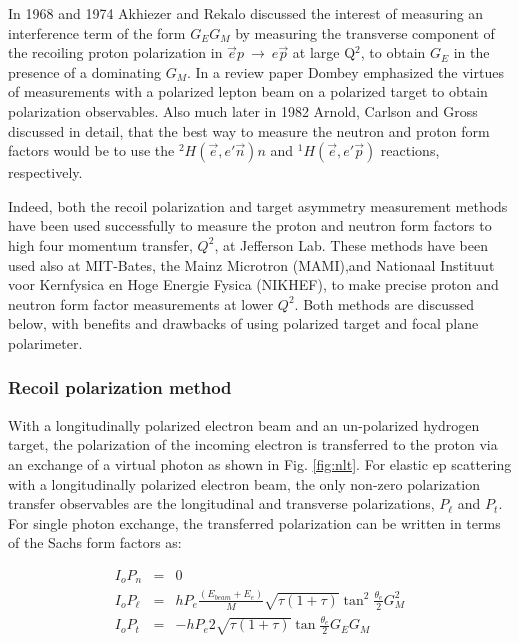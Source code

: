 In 1968 and 1974 Akhiezer and Rekalo \cite{akh1} discussed the interest of measuring 
an interference term of the form  $G_{E}G_{M}$ by measuring the transverse 
component of the recoiling proton polarization in $\vec e p~\rightarrow~e \vec p$  
at large Q$^2$, to obtain $G_E$ in the presence of a dominating $G_M$.
In a review paper Dombey \cite{dombey} emphasized the virtues of measurements with a polarized lepton beam 
on a polarized target to obtain polarization observables. 
Also much later in 1982 Arnold, Carlson and Gross \cite{arnold} discussed in detail, that the best way 
to measure the neutron and proton form factors would be to use the $^2H( \vec e,e' \vec n)n$ 
and $^1H( \vec e,e' \vec p)$ reactions, respectively.

Indeed, both the recoil polarization and target asymmetry measurement methods have
been used successfully to measure the proton and neutron form factors to high 
four momentum transfer, $Q^2$, at Jefferson Lab. These methods have been used also at MIT-Bates, the Mainz 
Microtron (MAMI),and Nationaal Instituut voor Kernfysica en Hoge Energie Fysica (NIKHEF), to make precise 
proton and neutron form factor measurements at lower $Q^2$. Both methods are discussed below, with 
benefits and drawbacks of using polarized target and focal plane polarimeter.  


\subsubsection{Recoil polarization method}

\label{subsubsec:poltrans}

With a longitudinally polarized electron beam and an un-polarized hydrogen target, the 
polarization of the incoming electron is transferred to the proton via an exchange of a virtual photon as 
shown in Fig. \ref{fig:nlt}. 
For elastic ep 
scattering with a longitudinally polarized electron beam, the only non-zero
polarization transfer observables are the longitudinal and transverse
polarizations, $P_{\ell}$ and $P_t$. For single photon exchange, the 
transferred polarization can be written in terms of the Sachs form factors as:

\begin{eqnarray}
I_o P_n & = & 0  \nonumber \\
I_oP_\ell & = & hP_e\frac{(E_{beam}+E_{e})}{M}\sqrt{\tau(1+\tau)}\tan^2\frac{\theta_e}{2}  G_M^2 \nonumber \\ 
I_oP_t & = & -hP_e2 \sqrt{\tau(1+\tau)}\tan\frac{\theta_e}{2} G_EG_M 
\end{eqnarray}

